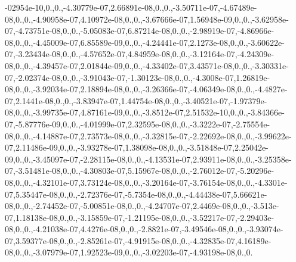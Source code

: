 \begin{DoxyCompactItemize}
-02954e-\/10,0.,0.,-\/4.\-30779e-\/07,2.\-66891e-\/08,0.,0.,-\/3.\-50711e-\/07,-\/4.\-67489e-\/08,0.,0.,-\/4.\-90958e-\/07,4.\-10972e-\/08,0.,0.,-\/3.\-67666e-\/07,1.\-56948e-\/09,0.,0.,-\/3.\-62958e-\/07,-\/4.\-73751e-\/08,0.,0.,-\/5.\-05083e-\/07,6.\-87214e-\/08,0.,0.,-\/2.\-98919e-\/07,-\/4.\-86966e-\/08,0.,0.,-\/4.\-45009e-\/07,6.\-85589e-\/09,0.,0.,-\/4.\-24441e-\/07,2.\-1273e-\/08,0.,0.,-\/3.\-60622e-\/07,-\/3.\-23434e-\/08,0.,0.,-\/4.\-57652e-\/07,4.\-84959e-\/08,0.,0.,-\/3.\-12164e-\/07,-\/4.\-24309e-\/08,0.,0.,-\/4.\-39457e-\/07,2.\-01844e-\/09,0.,0.,-\/4.\-33402e-\/07,3.\-43571e-\/08,0.,0.,-\/3.\-30331e-\/07,-\/2.\-02374e-\/08,0.,0.,-\/3.\-91043e-\/07,-\/1.\-30123e-\/08,0.,0.,-\/4.\-3008e-\/07,1.\-26819e-\/08,0.,0.,-\/3.\-92034e-\/07,2.\-18894e-\/08,0.,0.,-\/3.\-26366e-\/07,-\/4.\-06349e-\/08,0.,0.,-\/4.\-4827e-\/07,2.\-1441e-\/08,0.,0.,-\/3.\-83947e-\/07,1.\-44754e-\/08,0.,0.,-\/3.\-40521e-\/07,-\/1.\-97379e-\/08,0.,0.,-\/3.\-99735e-\/07,4.\-87161e-\/09,0.,0.,-\/3.\-8512e-\/07,2.\-51532e-\/10,0.,0.,-\/3.\-84366e-\/07,-\/5.\-87776e-\/09,0.,0.,-\/4.\-01999e-\/07,2.\-32595e-\/08,0.,0.,-\/3.\-3222e-\/07,-\/2.\-75554e-\/08,0.,0.,-\/4.\-14887e-\/07,2.\-73573e-\/08,0.,0.,-\/3.\-32815e-\/07,-\/2.\-22692e-\/08,0.,0.,-\/3.\-99622e-\/07,2.\-11486e-\/09,0.,0.,-\/3.\-93278e-\/07,1.\-38098e-\/08,0.,0.,-\/3.\-51848e-\/07,2.\-25042e-\/09,0.,0.,-\/3.\-45097e-\/07,-\/2.\-28115e-\/08,0.,0.,-\/4.\-13531e-\/07,2.\-93911e-\/08,0.,0.,-\/3.\-25358e-\/07,-\/3.\-51481e-\/08,0.,0.,-\/4.\-30803e-\/07,5.\-15967e-\/08,0.,0.,-\/2.\-76012e-\/07,-\/5.\-20296e-\/08,0.,0.,-\/4.\-32101e-\/07,3.\-73124e-\/08,0.,0.,-\/3.\-20164e-\/07,-\/3.\-76154e-\/08,0.,0.,-\/4.\-3301e-\/07,5.\-35447e-\/08,0.,0.,-\/2.\-72376e-\/07,-\/5.\-7354e-\/08,0.,0.,-\/4.\-44438e-\/07,5.\-66621e-\/08,0.,0.,-\/2.\-74452e-\/07,-\/5.\-00851e-\/08,0.,0.,-\/4.\-24707e-\/07,2.\-4469e-\/08,0.,0.,-\/3.\-513e-\/07,1.\-18138e-\/08,0.,0.,-\/3.\-15859e-\/07,-\/1.\-21195e-\/08,0.,0.,-\/3.\-52217e-\/07,-\/2.\-29403e-\/08,0.,0.,-\/4.\-21038e-\/07,4.\-4276e-\/08,0.,0.,-\/2.\-8821e-\/07,-\/3.\-49546e-\/08,0.,0.,-\/3.\-93074e-\/07,3.\-59377e-\/08,0.,0.,-\/2.\-85261e-\/07,-\/4.\-91915e-\/08,0.,0.,-\/4.\-32835e-\/07,4.\-16189e-\/08,0.,0.,-\/3.\-07979e-\/07,1.\-92523e-\/09,0.,0.,-\/3.\-02203e-\/07,-\/4.\-93198e-\/08,0.,0.\
\end{DoxyCompactItemize}
